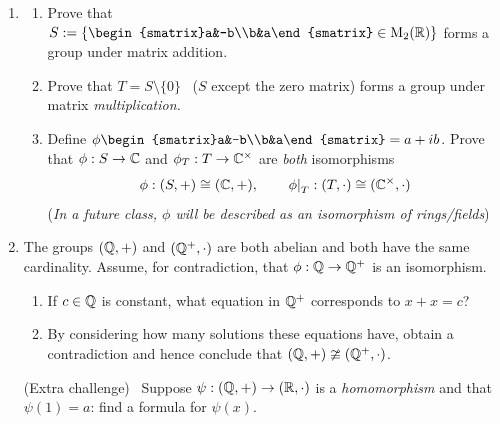 \begin{exercises}{}
\begin{enumerate}
  \item\begin{enumerate}
    \item Prove that $S:=\left\{\begin{smatrix}a&-b\\b&a\end{smatrix}\in \rM_2(\R)\right\}$ forms a group under matrix addition.
    \item Prove that $T=S\setminus\{0\}$ \ ($S$ except the zero matrix) forms a group under matrix \emph{multiplication.}
    \item Define $\phi\begin{smatrix}a&-b\\b&a\end{smatrix}=a+ib$. Prove that $\phi:S\to\mathbb{C}$ and $\phi_T:T\to\mathbb{C}^\times$ are \emph{both} isomorphisms
    \[\phi:(S,+)\cong(\mathbb{C},+),\qquad \left.\phi\right|_{T}:(T,\cdot)\cong(\mathbb{C}^\times,\cdot)\]
    (\emph{In a future class, $\phi$ will be described as an isomorphism of rings/fields})
  \end{enumerate}
  
  

	
  
	
	
	\item The groups $(\mathbb{Q},+)$ and $(\mathbb{Q}^+,\cdot)$ are both abelian and both have the same cardinality. Assume, for contradiction, that $\phi:\mathbb{Q}\to\mathbb{Q}^+$ is an isomorphism.
	\begin{enumerate}
	  \item If $c\in\mathbb{Q}$ is constant, what equation in $\mathbb{Q}^+$ corresponds to $x+x=c$?
	  \item By considering how many solutions these equations have, obtain a contradiction and hence conclude that $(\mathbb{Q},+)\ncong(\mathbb{Q}^+,\cdot)$.
	\end{enumerate}
	(Extra challenge) \ Suppose $\psi:(\mathbb{Q},+)\to(\mathbb{R},\cdot)$ is a \emph{homomorphism} and that $\psi(1)=a$: find a formula for $\psi(x)$.
	

\end{enumerate}
\end{exercises}
